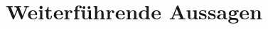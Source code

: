 \documentclass[ngerman
  ,numbers=noenddot %
  ,headsepline
  ,parskip=half*
  ,openany
  ,DIV=15
]{scrbook}
\numberwithin{equation}{chapter}
\numberwithin{figure}{chapter}
\theoremstyle{plain}%
\theoremstyle{definition}
\theoremstyle{remark}
\begin{document}

\frontmatter



\tableofcontents{}



\mainmatter





\chapter{Weiterführende Aussagen}


\appendix
{}



\nocite{*}
% 


\end{document}
